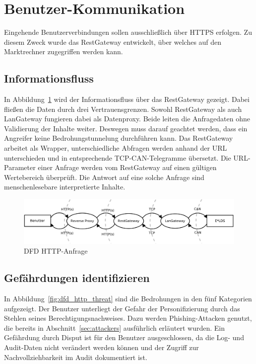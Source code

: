 \documentclass[11pt,a4paper]{report}
\begin{document}
\section{Benutzer-Kommunikation} \label{sec:model_http}

Eingehende Benutzerverbindungen sollen ausschließlich über HTTPS erfolgen. Zu diesem Zweck wurde das RestGateway entwickelt, über welches auf den Marktrechner zugegriffen werden kann. 	

\subsection{Informationsfluss}

In Abbildung~\ref{fig:dfd_http} wird der Informationsfluss über das RestGateway gezeigt. Dabei fließen die Daten durch drei Vertrauensgrenzen. Sowohl RestGateway als auch LanGateway fungieren dabei als Datenproxy. Beide leiten die Anfragedaten ohne Validierung der Inhalte weiter. Deswegen muss darauf geachtet werden, dass ein Angreifer keine Bedrohungstunnelung durchführen kann. Das RestGateway arbeitet als Wrapper, unterschiedliche Abfragen werden anhand der URL unterschieden und in entsprechende TCP-CAN-Telegramme übersetzt. Die URL-Parameter einer Anfrage werden vom RestGateway auf einen gültigen Wertebereich überprüft. Die Antwort auf eine solche Anfrage sind menschenlesebare interpretierte Inhalte.

\begin{figure}[htbp]
\centering
\includegraphics[scale=0.3]{images/dfd_http.pdf}
\caption{DFD HTTP-Anfrage}
\label{fig:dfd_http}
\end{figure}

\subsection{Gefährdungen identifizieren}

In Abbildung~\ref{fig:dfd_http_threat} sind die Bedrohungen in den fünf Kategorien aufgezeigt. Der Benutzer unterliegt der Gefahr der Personifizierung durch das Stehlen seines Berechtigungsnachweises. Dazu werden Phishing-Attacken genutzt, die bereits in Abschnitt~\ref{sec:attackers} ausführlich erläutert wurden. Ein Gefährdung durch Disput ist für den Benutzer ausgeschlossen, da die Log- und Audit-Daten nicht verändert werden können und der Zugriff zur Nachvollziehbarkeit im Audit dokumentiert ist. 
\end{document}
